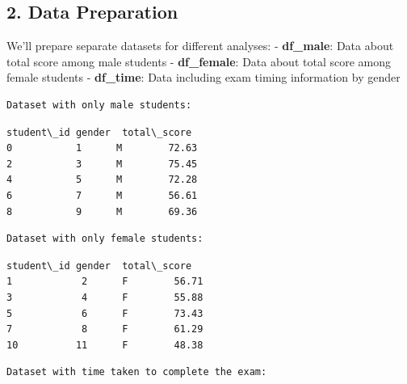\documentclass[11pt]{article}
\begin{document}
    \subsection{2. Data Preparation}\label{data-preparation}

We'll prepare separate datasets for different analyses: -
\textbf{df\_male}: Data about total score among male students -
\textbf{df\_female}: Data about total score among female students -
\textbf{df\_time}: Data including exam timing information by gender

    \begin{Verbatim}[commandchars=\\\{\}]
Dataset with only male students:
    \end{Verbatim}

            \begin{tcolorbox}[breakable, size=fbox, boxrule=.5pt, pad at break*=1mm, opacityfill=0]
\begin{Verbatim}[commandchars=\\\{\}]
   student\_id gender  total\_score
0           1      M        72.63
2           3      M        75.45
4           5      M        72.28
6           7      M        56.61
8           9      M        69.36
\end{Verbatim}
\end{tcolorbox}
        
    \begin{Verbatim}[commandchars=\\\{\}]
Dataset with only female students:
    \end{Verbatim}

            \begin{tcolorbox}[breakable, size=fbox, boxrule=.5pt, pad at break*=1mm, opacityfill=0]
\begin{Verbatim}[commandchars=\\\{\}]
    student\_id gender  total\_score
1            2      F        56.71
3            4      F        55.88
5            6      F        73.43
7            8      F        61.29
10          11      F        48.38
\end{Verbatim}
\end{tcolorbox}
        
    \begin{Verbatim}[commandchars=\\\{\}]
Dataset with time taken to complete the exam:
    \end{Verbatim}
\end{document}
